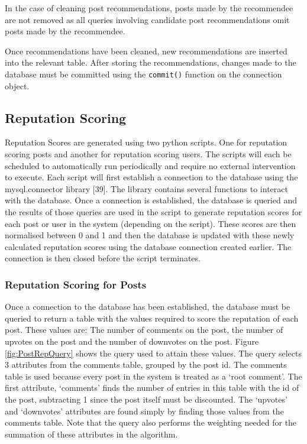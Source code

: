 In the case of cleaning post recommendations, posts made by the recommendee are not removed as all queries involving candidate post recommendations omit posts made by the recommendee.

Once recommendations have been cleaned, new recommendations are inserted into the relevant table. After storing the recommendations, changes made to the database must be committed using the \texttt{commit()} function on the connection object.

\subsection{Reputation Scoring}
Reputation Scores are generated using two python scripts. One for reputation scoring posts and another for reputation scoring users. The scripts will each be scheduled to automatically run periodically and require no external intervention to execute. Each script will first establish a connection to the database using the mysql.connector library [39]. The library contains several functions to interact with the database. Once a connection is established, the database is queried and the results of those queries are used in the script to generate reputation scores for each post or user in the system (depending on the script). These scores are then normalised between 0 and 1 and then the database is updated with these newly calculated reputation scores using the database connection created earlier. The connection is then closed before the script terminates.

\subsubsection{Reputation Scoring for Posts}
Once a connection to the database has been established, the database must be queried to return a table with the values required to score the reputation of each post. These values are: The number of comments on the post, the number of upvotes on the post and the number of downvotes on the post. Figure \ref{fig:PostRepQuery} shows the query used to attain these values. The query selects 3 attributes from the comments table, grouped by the post id. The comments table is used because every post in the system is treated as a `root comment'. The first attribute, `comments' finds the number of entries in this table with the id of the post, subtracting 1 since the post itself must be discounted. The `upvotes' and 	`downvotes' attributes are found simply by finding those values from the comments table. Note that the query also performs the weighting needed for the summation of these attributes in the algorithm.

